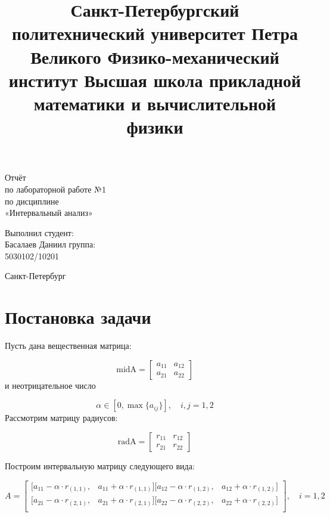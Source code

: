 \documentclass[a4paper,12pt]{article}
\title{Санкт-Петербургский политехнический университет
Петра Великого
Физико-механический институт
Высшая школа прикладной математики и вычислительной
физики}
\date{}
\begin{document}
\maketitle
\begin{center}
{\fontsize{25}{}\selectfont Отчёт \\
по лабораторной работе №1 \\
по дисциплине \\
«Интервальный анализ»}

\end{center}
\vspace{3 cm}
\begin{flushright}
Выполнил студент:\\
Басалаев Даниил
группа:\\
5030102/10201\\

\end{flushright}

\vspace*{\fill} \begin{center}Санкт-Петербург\end{center}

\newpage %
\tableofcontents


\newpage
\section{Постановка задачи}

Пусть дана вещественная матрица:

\[
\text{midA} = \begin{bmatrix}
a_{11} & a_{12} \\
a_{21} & a_{22}
\end{bmatrix} \tag{1}
\]
и неотрицательное число

\[
\alpha \in [0, \max\{a_{ij}\}], \quad i, j = 1, 2 \tag{2}
\]
Рассмотрим матрицу радиусов:

\[
\text{radA} = \begin{bmatrix}
r_{11} & r_{12} \\
r_{21} & r_{22}
\end{bmatrix} \tag{3}
\]

Построим интервальную матрицу следующего вида:

\[
A = \begin{bmatrix}
[a_{11} - \alpha \cdot r_{(1,1)}, & a_{11} + \alpha \cdot r_{(1,1)}]
[a_{12} - \alpha \cdot r_{(1,2)}, & a_{12} + \alpha \cdot r_{(1,2)}] \\
[a_{21} - \alpha \cdot r_{(2,1)}, & a_{21} + \alpha \cdot r_{(2,1)}] 
[a_{22} - \alpha \cdot r_{(2,2)}, & a_{22} + \alpha \cdot r_{(2,2)}] \\
\end{bmatrix}, \quad i = 1, 2  \tag{4}
\]
\end{document}
